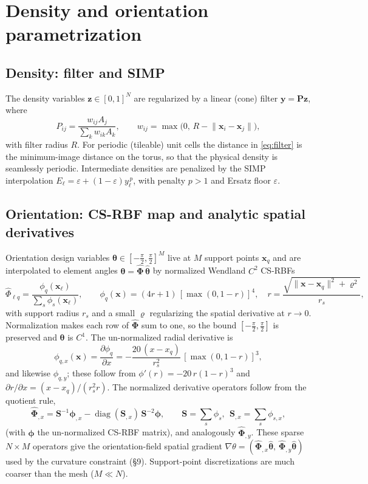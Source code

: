 \documentclass[11pt]{article}
\newcommand{\vth}{\bm{\theta}}
\newcommand{\vthh}{\hat{\bm{\theta}}}
\newcommand{\vz}{\mathbf{z}}
\newcommand{\vy}{\mathbf{y}}
\newcommand{\vP}{\mathbf{P}}
\newcommand{\vS}{\mathbf{S}}
\newcommand{\vPhi}{\hat{\bm{\Phi}}}
\begin{document}
\section{Density and orientation parametrization}
\subsection{Density: filter and SIMP}
The density variables $\vz\in[0,1]^N$ are regularized by a linear (cone) filter
$\vy=\vP\vz$, where
\begin{equation}
  P_{ij}=\frac{w_{ij}A_j}{\sum_k w_{ik}A_k},\qquad
  w_{ij}=\max\!\bigl(0,\,R-\lVert\mathbf{x}_i-\mathbf{x}_j\rVert\bigr),
  \label{eq:filter}
\end{equation}
with filter radius $R$. For periodic (tileable) unit cells the distance in
\eqref{eq:filter} is the minimum-image distance on the torus, so that the
physical density is seamlessly periodic. Intermediate densities are penalized by
the SIMP interpolation $E_\ell=\varepsilon+(1-\varepsilon)y_\ell^{\,p}$, with
penalty $p>1$ and Ersatz floor $\varepsilon$.

\subsection{Orientation: CS-RBF map and analytic spatial derivatives}
Orientation design variables $\vthh\in[-\tfrac\pi2,\tfrac\pi2]^M$ live at $M$
support points $\mathbf{x}_q$ and are interpolated to element angles
$\vth=\vPhi\,\vthh$ by normalized Wendland $C^2$ CS-RBFs
\begin{equation}
  \hat\Phi_{\ell q}=\frac{\phi_q(\mathbf{x}_\ell)}{\sum_{s}\phi_s(\mathbf{x}_\ell)},
  \qquad
  \phi_q(\mathbf{x})=(4r+1)\,[\max(0,1-r)]^4,\quad
  r=\frac{\sqrt{\lVert\mathbf{x}-\mathbf{x}_q\rVert^2+\varrho^2}}{r_s},
  \label{eq:csrbf}
\end{equation}
with support radius $r_s$ and a small $\varrho$ regularizing the spatial
derivative at $r\!\to\!0$. Normalization makes each row of $\vPhi$ sum to one, so
the bound $[-\tfrac\pi2,\tfrac\pi2]$ is preserved and $\vth$ is $C^1$. The
un-normalized radial derivative is
\begin{equation}
  \phi_{q,x}(\mathbf{x})=\frac{\partial\phi_q}{\partial x}
  =-\frac{20\,(x-x_q)}{r_s^2}\,[\max(0,1-r)]^3,
  \label{eq:phix}
\end{equation}
and likewise $\phi_{q,y}$; these follow from $\phi'(r)=-20\,r(1-r)^3$ and
$\partial r/\partial x=(x-x_q)/(r_s^2 r)$. The normalized derivative operators
follow from the quotient rule,
\begin{equation}
  \vPhi_{,x}=\vS^{-1}\bm\phi_{,x}-\operatorname{diag}(\vS_{,x})\,\vS^{-2}\bm\phi,
  \qquad
  \vS=\textstyle\sum_s\phi_s,\ \ \vS_{,x}=\sum_s\phi_{s,x},
  \label{eq:Phix}
\end{equation}
(with $\bm\phi$ the un-normalized CS-RBF matrix), and analogously $\vPhi_{,y}$.
These sparse $N\times M$ operators give the orientation-field spatial gradient
$\nabla\theta=(\vPhi_{,x}\vthh,\,\vPhi_{,y}\vthh)$ used by the curvature
constraint (\S9). Support-point discretizations are much coarser than the mesh
($M\ll N$).
\end{document}
